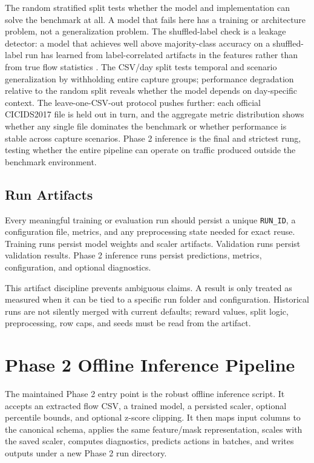 The random stratified split tests whether the model and implementation can solve the benchmark at all. A model that fails here has a training or architecture problem, not a generalization problem. The shuffled-label check is a leakage detector: a model that achieves well above majority-class accuracy on a shuffled-label run has learned from label-correlated artifacts in the features rather than from true flow statistics \parencite{Arp2020DosDontsMLSecurity}. The CSV/day split tests temporal and scenario generalization by withholding entire capture groups; performance degradation relative to the random split reveals whether the model depends on day-specific context. The leave-one-CSV-out protocol pushes further: each official CICIDS2017 file is held out in turn, and the aggregate metric distribution shows whether any single file dominates the benchmark or whether performance is stable across capture scenarios. Phase 2 inference is the final and strictest rung, testing whether the entire pipeline can operate on traffic produced outside the benchmark environment.

\subsection{Run Artifacts}
Every meaningful training or evaluation run should persist a unique \texttt{RUN\_ID}, a configuration file, metrics, and any preprocessing state needed for exact reuse. Training runs persist model weights and scaler artifacts. Validation runs persist validation results. Phase 2 inference runs persist predictions, metrics, configuration, and optional diagnostics.

This artifact discipline prevents ambiguous claims. A result is only treated as measured when it can be tied to a specific run folder and configuration. Historical runs are not silently merged with current defaults; reward values, split logic, preprocessing, row caps, and seeds must be read from the artifact.

\section{Phase 2 Offline Inference Pipeline}
The maintained Phase 2 entry point is the robust offline inference script. It accepts an extracted flow CSV, a trained model, a persisted scaler, optional percentile bounds, and optional z-score clipping. It then maps input columns to the canonical schema, applies the same feature/mask representation, scales with the saved scaler, computes diagnostics, predicts actions in batches, and writes outputs under a new Phase 2 run directory.

